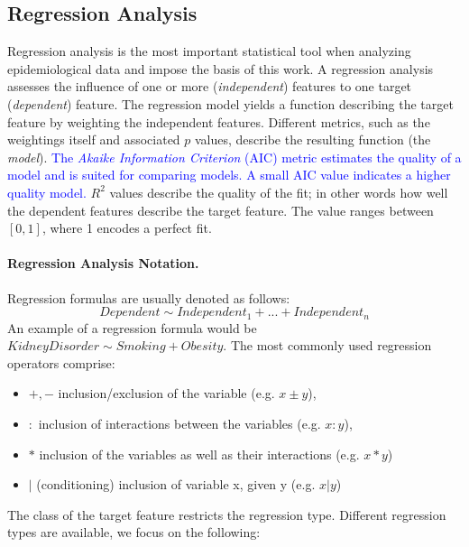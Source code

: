 \documentclass[journal]{style/vgtc} 			          %
\newcommand{\add}[1]{\textcolor{blue}{#1}}
\begin{document}
\subsection{Regression Analysis} \label{sec:RegressionAnalysis}
Regression analysis is the most important statistical tool when analyzing epidemiological data and impose the basis of this work.
A regression analysis assesses the influence of one or more (\emph{independent}) features to one target (\emph{dependent}) feature.
The regression model yields a function describing the target feature by weighting the independent features.
Different metrics, such as the weightings itself and associated $p$ values, describe the resulting function (the \emph{model}).
\add{
The \emph{Akaike Information Criterion} (AIC) metric estimates the quality of a model and is suited for comparing models.
A small AIC value indicates a higher quality model.
}
$R^2$ values describe the quality of the fit; in other words how well the dependent features describe the target feature.
The value ranges between $[0, 1]$, where 1 encodes a perfect fit.

\paragraph{Regression Analysis Notation.} Regression formulas are usually denoted as follows:
\begin{equation}
Dependent \sim Independent_1 + ... + Independent_n
\label{eq:RegressionNotation}
\end{equation}
An example of a regression formula would be $KidneyDisorder \sim Smoking + Obesity$.
The most commonly used regression operators comprise:
\begin{itemize}
	\item $+,-$ inclusion/exclusion of the variable (e.g. $x\pm y$),
	\item $:$ inclusion of interactions between the variables (e.g. $x:y$),
	\item $*$ inclusion of the variables as well as their interactions (e.g. $x*y$)
	\item $|$ (conditioning) inclusion of variable x, given y (e.g. $x|y$)
\end{itemize}
The class of the target feature restricts the regression type.
Different regression types are available, we focus on the following:
\end{document}
